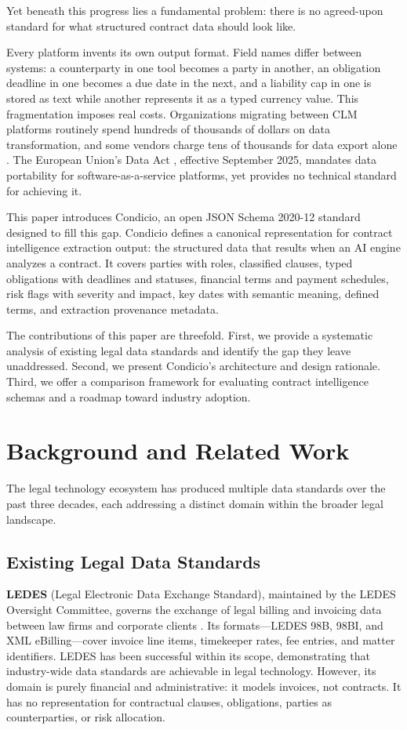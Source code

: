 \documentclass[11pt,a4paper]{article}
\begin{document}
Yet beneath this progress lies a fundamental problem: there is no agreed-upon standard for what structured contract data should look like.

Every platform invents its own output format. Field names differ between systems: a counterparty in one tool becomes a party in another, an obligation deadline in one becomes a due date in the next, and a liability cap in one is stored as text while another represents it as a typed currency value. This fragmentation imposes real costs. Organizations migrating between CLM platforms routinely spend hundreds of thousands of dollars on data transformation, and some vendors charge tens of thousands for data export alone \cite{clio-lock-in}. The European Union's Data Act \cite{eu-data-act}, effective September 2025, mandates data portability for software-as-a-service platforms, yet provides no technical standard for achieving it.

This paper introduces Condicio, an open JSON Schema 2020-12 standard designed to fill this gap. Condicio defines a canonical representation for contract intelligence extraction output: the structured data that results when an AI engine analyzes a contract. It covers parties with roles, classified clauses, typed obligations with deadlines and statuses, financial terms and payment schedules, risk flags with severity and impact, key dates with semantic meaning, defined terms, and extraction provenance metadata.

The contributions of this paper are threefold. First, we provide a systematic analysis of existing legal data standards and identify the gap they leave unaddressed. Second, we present Condicio's architecture and design rationale. Third, we offer a comparison framework for evaluating contract intelligence schemas and a roadmap toward industry adoption.

\section{Background and Related Work}

The legal technology ecosystem has produced multiple data standards over the past three decades, each addressing a distinct domain within the broader legal landscape.

\subsection{Existing Legal Data Standards}

\textbf{LEDES} (Legal Electronic Data Exchange Standard), maintained by the LEDES Oversight Committee, governs the exchange of legal billing and invoicing data between law firms and corporate clients \cite{ledes}. Its formats---LEDES 98B, 98BI, and XML eBilling---cover invoice line items, timekeeper rates, fee entries, and matter identifiers. LEDES has been successful within its scope, demonstrating that industry-wide data standards are achievable in legal technology. However, its domain is purely financial and administrative: it models invoices, not contracts. It has no representation for contractual clauses, obligations, parties as counterparties, or risk allocation.
\end{document}
